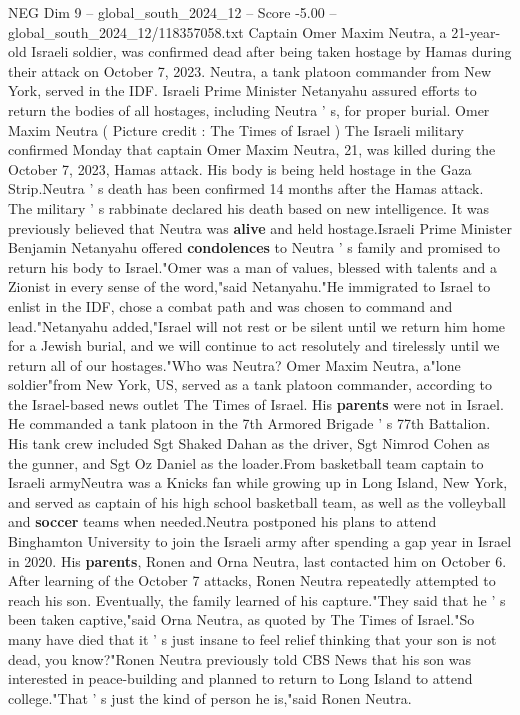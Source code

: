 \begin{textsample}{NEG Dim 9 – global\_south\_2024\_12 – Score -5.00 – global\_south\_2024\_12/118357058.txt}  \label{ex:f9_neg_213}
Captain Omer Maxim Neutra, a 21-year-old Israeli soldier, was confirmed dead after being taken hostage by Hamas during their attack on October 7, 2023.
Neutra, a tank platoon commander from New York, served in the IDF.
Israeli Prime Minister Netanyahu assured efforts to return the bodies of all hostages, including Neutra ' s, for proper burial.
Omer Maxim Neutra ( Picture credit : The Times of Israel ) The Israeli military confirmed Monday that captain Omer Maxim Neutra, 21, was killed during the October 7, 2023, Hamas attack.
His body is being held hostage in the Gaza Strip.Neutra ' s death has been confirmed 14 months after the Hamas attack.
The military ' s rabbinate declared his death based on new intelligence.
It was previously believed that Neutra was \textbf{alive} and held hostage.Israeli Prime Minister Benjamin Netanyahu offered \textbf{condolences} to Neutra ' s family and promised to return his body to Israel."Omer was a man of values, blessed with talents and a Zionist in every sense of the word,"said Netanyahu."He immigrated to Israel to enlist in the IDF, chose a combat path and was chosen to command and lead."Netanyahu added,"Israel will not rest or be silent until we return him home for a Jewish burial, and we will continue to act resolutely and tirelessly until we return all of our hostages."Who was Neutra?
Omer Maxim Neutra, a"lone soldier"from New York, US, served as a tank platoon commander, according to the Israel-based news outlet The Times of Israel.
His \textbf{parents} were not in Israel.
He commanded a tank platoon in the 7th Armored Brigade ' s 77th Battalion.
His tank crew included Sgt Shaked Dahan as the driver, Sgt Nimrod Cohen as the gunner, and Sgt Oz Daniel as the loader.From basketball team captain to Israeli armyNeutra was a Knicks fan while growing up in Long Island, New York, and served as captain of his high school basketball team, as well as the volleyball and \textbf{soccer} teams when needed.Neutra postponed his plans to attend Binghamton University to join the Israeli army after spending a gap year in Israel in 2020.
His \textbf{parents}, Ronen and Orna Neutra, last contacted him on October 6.
After learning of the October 7 attacks, Ronen Neutra repeatedly attempted to reach his son.
Eventually, the family learned of his capture."They said that he ' s been taken captive,"said Orna Neutra, as quoted by The Times of Israel."So many have died that it ' s just insane to feel relief thinking that your son is not dead, you know?"Ronen Neutra previously told CBS News that his son was interested in peace-building and planned to return to Long Island to attend college."That ' s just the kind of person he is,"said Ronen Neutra.

\end{textsample}

